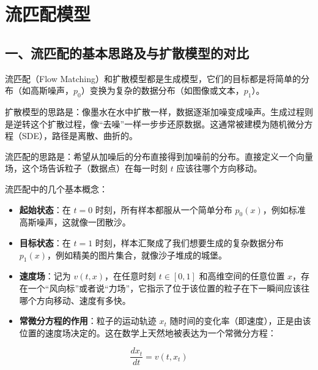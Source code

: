 \setcounter{section}{0}

\hypertarget{ux6d41ux5339ux914dux6a21ux578b-1}{%
\section{流匹配模型}\label{ux6d41ux5339ux914dux6a21ux578b-1}}

\hypertarget{ux4e00ux6d41ux5339ux914dux7684ux57faux672cux601dux8defux53caux4e0eux6269ux6563ux6a21ux578bux7684ux5bf9ux6bd4}{%
\subsection{一、流匹配的基本思路及与扩散模型的对比}\label{ux4e00ux6d41ux5339ux914dux7684ux57faux672cux601dux8defux53caux4e0eux6269ux6563ux6a21ux578bux7684ux5bf9ux6bd4}}

流匹配（Flow Matching）和扩散模型都是生成模型，它们的目标都是将简单的分布（如高斯噪声，\(p_0\)）变换为复杂的数据分布（如图像或文本，\(p_1\)）。

扩散模型的思路是：像墨水在水中扩散一样，数据逐渐加噪变成噪声。生成过程则是逆转这个扩散过程，像``去噪''一样一步步还原数据。这通常被建模为随机微分方程（SDE），路径是离散、曲折的。

流匹配的思路是：希望从加噪后的分布直接得到加噪前的分布。直接定义一个向量场，这个场告诉粒子（数据点）在每一时刻 \(t\) 应该往哪个方向移动。

流匹配中的几个基本概念：

\begin{itemize}
\tightlist
\item
  \textbf{起始状态}：在 \(t=0\) 时刻，所有样本都服从一个简单分布 \(p_0(x)\)，例如标准高斯噪声，这就像一团散沙。
\item
  \textbf{目标状态}：在 \(t=1\) 时刻，样本汇聚成了我们想要生成的复杂数据分布 \(p_1(x)\)，例如精美的图片集合，就像沙子堆成的城堡。
\item
  \textbf{速度场}：记为 \(v(t,x)\)，在任意时刻 \(t\in[0,1]\) 和高维空间的任意位置 \(x\)，存在一个``风向标''或者说``力场''，它指示了位于该位置的粒子在下一瞬间应该往哪个方向移动、速度有多快。
\item
{}
  \textbf{常微分方程的作用}：粒子的运动轨迹 \(x_t\) 随时间的变化率（即速度），正是由该位置的速度场决定的。这在数学上天然地被表达为一个常微分方程：
\end{itemize}

\[
\frac{dx_t}{dt}=v(t,x_t)
\]

